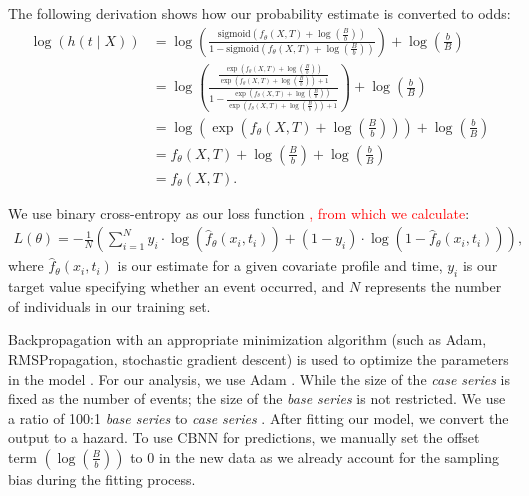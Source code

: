 \documentclass[preprint,12pt,authoryear]{elsarticle}
\begin{document}
The following derivation shows how our probability estimate is converted
to odds: \begin{align*}
 \log\left( h(t \mid X) \right) &= \log\left(\frac{\mathrm{sigmoid}\left(f_{\theta}(X, T) + \log\left(\frac{B}{b}\right)\right)}{1-\mathrm{sigmoid}\left(f_{\theta}(X, T) + \log\left(\frac{B}{b}\right)\right)}\right) + \log\left(\frac{b}{B}\right) \\
 &= \log\left( \frac{\frac{\exp\left(f_{\theta}(X, T) + \log\left(\frac{B}{b}\right)\right)}{\exp\left(f_{\theta}(X, T) + \log\left(\frac{B}{b}\right)\right)+1}}{1-\frac{\exp\left(f_{\theta}(X, T) + \log\left(\frac{B}{b}\right)\right)}{\exp\left(f_{\theta}(X, T) + \log\left(\frac{B}{b}\right)\right)+1}}\right) + \log\left(\frac{b}{B}\right) \\
 &= \log\left(\exp\left( f_{\theta}(X, T) + \log\left(\frac{B}{b}\right) \right) \right) + \log\left(\frac{b}{B}\right) \\
 &= f_{\theta}(X, T) + \log\left(\frac{B}{b}\right) + \log\left(\frac{b}{B}\right) \\
&= f_{\theta}(X, T). 
\end{align*}

We use binary cross-entropy as our loss function \citep{gulli2017}\textcolor{red}{, from which we calculate}:
\begin{align*}
L(\theta)=-\frac{1}{N}\left( \sum^{N}_{i=1} y_{i} \cdot \log(\hat{f}_{\theta}(x_{i}, t_{i}) ) + (1-y_{i} )\cdot \log(1-\hat{f}_{\theta}(x_{i}, t_{i}) ) \right),
\end{align*} where \(\hat{f}_{\theta}(x_{i}, t_{i})\) is our estimate for a given covariate profile and time, \(y_{i}\) is our target value specifying whether an event occurred, and \(N\) represents the number of individuals in our training set.

Backpropagation with an appropriate minimization algorithm (such as Adam, RMSPropagation, stochastic gradient descent) is used to optimize the parameters in the model \citep{gulli2017}. For our analysis, we use Adam \textcolor{red}{\citep{kingma2014adam}}. While the size of the \emph{case series} is fixed as the number of events; the size of the \emph{base series} is not restricted. We use a ratio of 100:1 \emph{base series} to \emph{case series} \citep{hanley2009}. After fitting our model, we convert the output to a hazard. To use CBNN for predictions, we manually set the offset term $\left(\log\left(\frac{B}{b} \right)\right)$ to 0 in the new data as we already account for the sampling bias during the fitting process.
\end{document}
